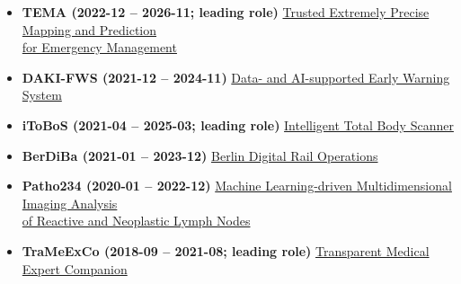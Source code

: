 
\begin{itemize}
    \item [] \textbf{TEMA (2022-12 -- 2026-11; leading role)}
    \href{https://www.hhi.fraunhofer.de/en/departments/ai/projects/tema.html}{Trusted Extremely Precise Mapping and Prediction\\
    \vphantom{}\qquad for Emergency Management}

    \item [] \textbf{DAKI-FWS (2021-12 -- 2024-11)}
    \href{https://www.hhi.fraunhofer.de/en/departments/ai/projects/daki-fws.html}{Data- and AI-supported Early Warning System}
    
    \item [] \textbf{iToBoS (2021-04 -- 2025-03; leading role)}
    \href{https://www.hhi.fraunhofer.de/en/departments/ai/projects/itobos.html}{Intelligent Total Body Scanner}

    \item [] \textbf{BerDiBa (2021-01 -- 2023-12)}
    \href{https://www.hhi.fraunhofer.de/en/departments/ai/projects/berdiba.html}{Berlin Digital Rail Operations}

    \item [] \textbf{Patho234 (2020-01 -- 2022-12)}
    \href{https://www.hhi.fraunhofer.de/en/departments/ai/projects/patho234.html}{Machine Learning-driven Multidimensional Imaging Analysis\\
    \vphantom{}\qquad of Reactive  and Neoplastic Lymph Nodes}

    \item [] \textbf{TraMeExCo (2018-09 -- 2021-08; leading role)}
    \href{https://www.hhi.fraunhofer.de/en/departments/ai/projects/trameexco.html}{Transparent Medical Expert Companion}
\end{itemize}








